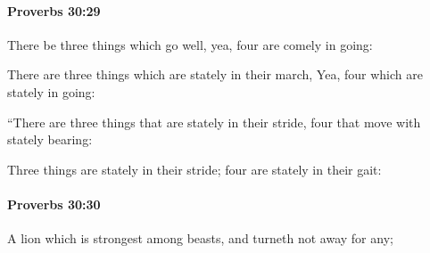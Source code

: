 		\paragraph{Proverbs 30:29} %
			\label{PROVERBS-30-29}

			There be three things which go well, yea, four are comely in going:

			\begin{versebox}
					\item[BHS] 
					\item[ASV] There are three things which are stately in their march, Yea, four which are stately in going:
					\item[NIV] “There are three things that are stately in their stride, four that move with stately bearing:
					\item[NRSV] Three things are stately in their stride; four are stately in their gait:
			\end{versebox}

		\paragraph{Proverbs 30:30} %
			\label{PROVERBS-30-30}

			A lion which is strongest among beasts, and turneth not away for any;

